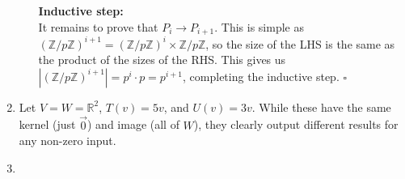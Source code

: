 \documentclass[12pt]{article}
\begin{document}
\begin{enumerate}
\begin{enumerate}
                        \textbf{Inductive step:} \\
                        It remains to prove that $P_i \rightarrow P_{i+1}$.
                        This is simple as $(\mathbb{Z}/p\mathbb{Z})^{i+1}=(\mathbb{Z}/p\mathbb{Z})^i \times \mathbb{Z}/p\mathbb{Z}$,
                        so the size of the LHS is the same as the product of the sizes of the RHS.
                        This gives us $|(\mathbb{Z}/p\mathbb{Z})^{i+1}|=p^i \cdot p=p^{i+1}$,
                        completing the inductive step. $\square$
            \end{enumerate}
      \item Let $V=W=\mathbb{R}^2$, $T(v)=5v$, and $U(v)=3v$.
            While these have the same kernel (just $\vec{0}$) and image (all of $W$),
            they clearly output different results for any non-zero input.
      \item {}
\end{enumerate}
\end{document}
